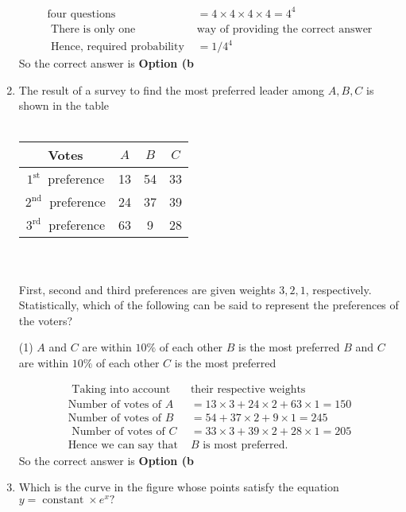 \begin{enumerate}
\begin{answer}
\begin{align*}
\text{four questions }&=4 \times 4 \times 4 \times 4=4^{4}\\
\text{	There is only one }&\text{way of providing the correct answer}\\
\text{	Hence, required probability }&=1 / 4^{4}
	\end{align*}
		So the correct answer is \textbf{Option (b}
\end{answer}
\item  The result of a survey to find the most preferred leader among $A, B, C$ is shown in the table\\\\
\renewcommand*{\arraystretch}{1.5}
	\begin{tabular}{|c|c|c|c|}
		\hline Votes & $A$ & $B$ & $C$ \\
		\hline $1^{\text {st }}$ preference & 13 & 54 & 33 \\
		\hline $2^{\text {nd }}$ preference & 24 & 37 & 39 \\
		\hline $3^{\text {rd }}$ preference & 63 & 9 & 28 \\
		\hline
	\end{tabular}\\\\
 First, second and third preferences are given weights $3,2,1$, respectively. Statistically, which of the following can be said to represent the preferences of the voters?
	 \begin{tasks}(1)
		\task[\textbf{a.}]$A$ and $C$ are within $10 \%$ of each other
		\task[\textbf{b.}]$B$ is the most preferred
		\task[\textbf{c.}]$B$ and $C$ are within $10 \%$ of each other
		\task[\textbf{d.}] $C$ is the most preferred
	\end{tasks}
\begin{answer}
	\begin{align*}
	\text{ Taking into account }&\text{their respective weights}\\
	\text{Number of votes of }A&=13 \times 3+24 \times 2+63 \times 1=150\\
	\text{Number of votes of }B&=54+37 \times 2+9 \times 1=245\\
\text{	Number of votes of }C&=33 \times 3+39 \times 2+28 \times 1=205\\
	\text{Hence we can say that }&\text{$B$ is most preferred.}
	\end{align*}
		So the correct answer is \textbf{Option (b}
\end{answer}
\item  Which is the curve in the figure whose points satisfy the equation $y=\operatorname{constant} \times e^{x} ?$

\end{enumerate}
